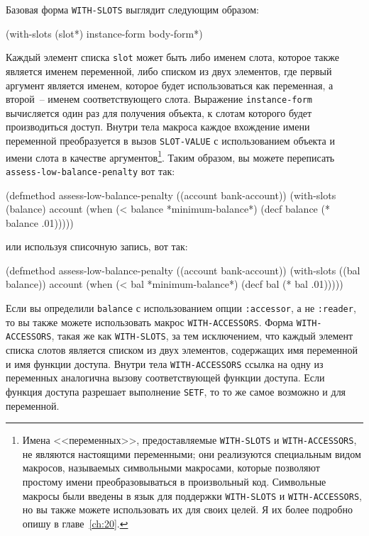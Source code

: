 Базовая форма  \lstinline{WITH-SLOTS} выглядит следующим образом:

\begin{myverb}
(with-slots (slot*) instance-form
  body-form*)
\end{myverb}

Каждый элемент списка \lstinline{slot} может быть либо именем слота, которое также является
именем переменной, либо списком из двух элементов, где первый аргумент является именем,
которое будет использоваться как переменная, а второй~-- именем соответствующего слота.
Выражение \lstinline{instance-form} вычисляется один раз для получения объекта, к слотам
которого будет производиться доступ.  Внутри тела макроса каждое вхождение имени
переменной преобразуется в вызов \lstinline{SLOT-VALUE} с использованием объекта и имени слота
в качестве аргументов\footnote{Имена <<переменных>>, предоставляемые \lstinline{WITH-SLOTS} и
  \lstinline{WITH-ACCESSORS}, не являются настоящими переменными; они реализуются специальным
  видом макросов, называемых символьными макросами, которые позволяют простому имени
  преобразовываться в произвольный код.  Символьные макросы были введены в язык для
  поддержки \lstinline{WITH-SLOTS} и \lstinline{WITH-ACCESSORS}, но вы также можете использовать их
  для своих целей.  Я их более подробно опишу в главе~\ref{ch:20}.}\hspace{\footnotenegspace}.  Таким образом, вы можете
  переписать \lstinline{assess-low-balance-penalty} вот так:

\begin{myverb}
(defmethod assess-low-balance-penalty ((account bank-account))
  (with-slots (balance) account
    (when (< balance *minimum-balance*)
      (decf balance (* balance .01)))))
\end{myverb}

\noindent{}или используя списочную запись, вот так:

\begin{myverb}
(defmethod assess-low-balance-penalty ((account bank-account))
  (with-slots ((bal balance)) account
    (when (< bal *minimum-balance*)
      (decf bal (* bal .01)))))
\end{myverb}

Если вы определили \lstinline{balance} с использованием опции \lstinline{:accessor}, а не
\lstinline{:reader}, то вы также можете использовать макрос \lstinline{WITH-ACCESSORS}.  Форма
\lstinline{WITH-ACCESSORS}, такая же как \lstinline{WITH-SLOTS}, за тем исключением, что каждый
элемент списка слотов является списком из двух элементов, содержащих имя переменной и имя
функции доступа.  Внутри тела \lstinline{WITH-ACCESSORS} ссылка на одну из переменных
аналогична вызову соответствующей функции доступа.  Если функция доступа разрешает
выполнение \lstinline{SETF}, то то же самое возможно и для переменной.

